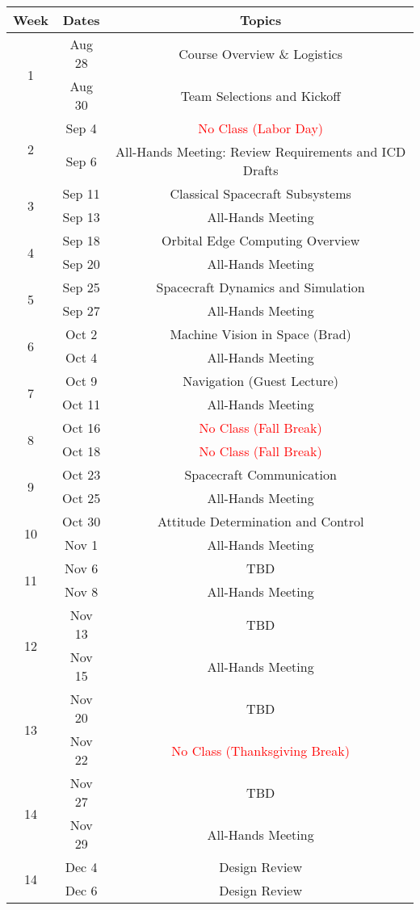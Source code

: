 \documentclass[11pt,letterpaper]{article}
\begin{document}
\begin{tabular}{c|c|c}
	Week & Dates & Topics \\
	\hline
	\multirow{2}{*}{1} & Aug 28 & Course Overview \& Logistics \\
	 & Aug 30 & Team Selections and Kickoff \\
	\hline
	\multirow{2}{*}{2} & Sep 4 & \textcolor{red}{No Class (Labor Day)} \\
	 & Sep 6 & All-Hands Meeting: Review Requirements and ICD Drafts \\
	\hline
	\multirow{2}{*}{3}  & Sep 11 & Classical Spacecraft Subsystems \\
	 & Sep 13 & All-Hands Meeting \\
	\hline
	\multirow{2}{*}{4}  & Sep 18 & Orbital Edge Computing Overview \\
	 & Sep 20 & All-Hands Meeting \\
	\hline
	\multirow{2}{*}{5}  & Sep 25 & Spacecraft Dynamics and Simulation  \\
	 & Sep 27 & All-Hands Meeting \\
	\hline
	\multirow{2}{*}{6}  & Oct 2 & Machine Vision in Space (Brad) \\
	 & Oct 4 & All-Hands Meeting \\
	\hline
	\multirow{2}{*}{7}  & Oct 9 & Navigation (Guest Lecture) \\
	 & Oct 11 & All-Hands Meeting \\
	\hline
	\multirow{2}{*}{8}  & Oct 16 & \textcolor{red}{No Class (Fall Break)} \\
	 & Oct 18 & \textcolor{red}{No Class (Fall Break)} \\
	\hline
	\multirow{2}{*}{9}  & Oct 23 & Spacecraft Communication \\
	 & Oct 25 & All-Hands Meeting \\
	\hline
	\multirow{2}{*}{10}  & Oct 30 & Attitude Determination and Control \\
	 & Nov 1 & All-Hands Meeting \\
	 \hline
	\multirow{2}{*}{11}  & Nov 6 & TBD \\
	 & Nov 8 & All-Hands Meeting \\
	 \hline
	\multirow{2}{*}{12}  & Nov 13 & TBD \\
	 & Nov 15 & All-Hands Meeting \\
	 \hline
	\multirow{2}{*}{13}  & Nov 20 & TBD \\
	 & Nov 22 & \textcolor{red}{No Class (Thanksgiving Break)} \\
	 \hline
	\multirow{2}{*}{14}  & Nov 27 & TBD \\
	 & Nov 29 & All-Hands Meeting \\
	 \hline
	\multirow{2}{*}{14}  & Dec 4 & Design Review \\
	 & Dec 6 & Design Review \\
\end{tabular}
\end{document}
